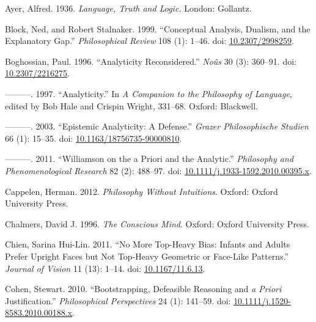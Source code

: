 \documentclass[
  11pt,
  letterpaper,
  DIV=11,
  numbers=noendperiod,
  twoside]{scrartcl}
\newlength{\cslhangindent}
\newenvironment{CSLReferences}[2] %
 {\begin{list}{}{%
  \setlength{\itemindent}{0pt}
  \setlength{\leftmargin}{0pt}
  \setlength{\parsep}{0pt}
  \ifodd #1
   \setlength{\leftmargin}{\cslhangindent}
   \setlength{\itemindent}{-1\cslhangindent}
  \fi
  \setlength{\itemsep}{#2\baselineskip}}}
 {\end{list}}
\begin{document}
\label{refs}
\begin{CSLReferences}{1}{0}
Ayer, Alfred. 1936. \emph{Language, Truth and Logic.} London: Gollantz.

Block, Ned, and Robert Stalnaker. 1999. {``{Conceptual Analysis,
Dualism, and the Explanatory Gap}.''} \emph{Philosophical Review} 108
(1): 1--46. doi:
\href{https://doi.org/10.2307/2998259}{10.2307/2998259}.

Boghossian, Paul. 1996. {``Analyticity Reconsidered.''} \emph{No{û}s} 30
(3): 360--91. doi:
\href{https://doi.org/10.2307/2216275}{10.2307/2216275}.

---------. 1997. {``Analyticity.''} In \emph{A Companion to the
Philosophy of Language}, edited by Bob Hale and Crispin Wright, 331--68.
Oxford: Blackwell.

---------. 2003. {``Epistemic Analyticity: A Defense.''} \emph{Grazer
Philosophische Studien} 66 (1): 15--35. doi:
\href{https://doi.org/10.1163/18756735-90000810}{10.1163/18756735-90000810}.

---------. 2011. {``Williamson on the a Priori and the Analytic.''}
\emph{Philosophy and Phenomenological Research} 82 (2): 488--97. doi:
\href{https://doi.org/10.1111/j.1933-1592.2010.00395.x}{10.1111/j.1933-1592.2010.00395.x}.

Cappelen, Herman. 2012. \emph{Philosophy Without Intuitions}. Oxford:
Oxford University Press.

Chalmers, David J. 1996. \emph{The Conscious Mind}. Oxford: Oxford
University Press.

Chien, Sarina Hui-Lin. 2011. {``No More Top-Heavy Bias: Infants and
Adults Prefer Upright Faces but Not Top-Heavy Geometric or Face-Like
Patterns.''} \emph{Journal of Vision} 11 (13): 1--14. doi:
\href{https://doi.org/10.1167/11.6.13}{10.1167/11.6.13}.

Cohen, Stewart. 2010. {``Bootstrapping, Defeasible Reasoning and \emph{a
Priori} Justification.''} \emph{Philosophical Perspectives} 24 (1):
141--59. doi:
\href{https://doi.org/10.1111/j.1520-8583.2010.00188.x}{10.1111/j.1520-8583.2010.00188.x}.


\end{CSLReferences}
\end{document}

